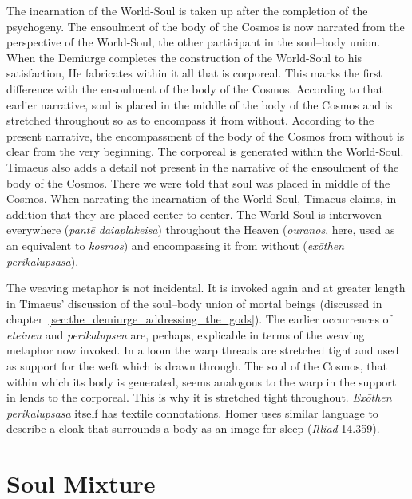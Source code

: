The incarnation of the World-Soul is taken up after the completion of the psychogeny. The ensoulment of the body of the Cosmos is now narrated from the perspective of the World-Soul, the other participant in the soul--body union. When the Demiurge completes the construction of the World-Soul to his satisfaction, He fabricates within it all that is corporeal. This marks the first difference with the ensoulment of the body of the Cosmos. According to that earlier narrative, soul is placed in the middle of the body of the Cosmos and is stretched throughout so as to encompass it from without. According to the present narrative, the encompassment of the body of the Cosmos from without is clear from the very beginning. The corporeal is generated within the World-Soul. Timaeus also adds a detail not present in the narrative of the ensoulment of the body of the Cosmos. There we were told that soul was placed in middle of the Cosmos. When narrating the incarnation of the World-Soul, Timaeus claims, in addition that they are placed center to center. The World-Soul is interwoven everywhere (\emph{pantē daiaplakeisa}) throughout the Heaven (\emph{ouranos}, here, used as an equivalent to \emph{kosmos}) and encompassing it from without (\emph{exōthen perikalupsasa}). 

The weaving metaphor is not incidental. It is invoked again and at greater length in Timaeus' discussion of the soul--body union of mortal beings (discussed in chapter~\ref{sec:the_demiurge_addressing_the_gods}). The earlier occurrences of \emph{eteinen} and \emph{perikalupsen} are, perhaps, explicable in terms of the weaving metaphor now invoked. In a loom the warp threads are stretched tight and used as support for the weft which is drawn through. The soul of the Cosmos, that within which its body is generated, seems analogous to the warp in the support in lends to the corporeal. This is why it is stretched tight throughout. \emph{Exōthen perikalupsasa} itself has textile connotations. Homer uses similar language to describe a cloak that surrounds a body as an image for sleep (\emph{Illiad} 14.359).



\section{Soul Mixture} %
\label{sec:soul_mixture}


